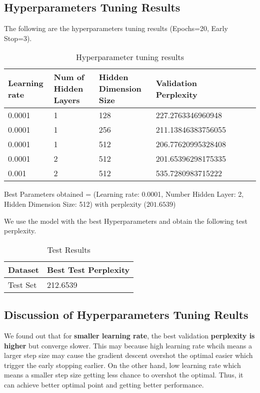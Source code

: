 \documentclass{article}
\begin{document}
\subsection{Hyperparameters Tuning Results}
The following are the hyperparameters tuning results (Epochs=20, Early Stop=3).

\begin{table}[htb]
	\caption{Hyperparameter tuning results}
	\label{sample-table}
	\centering
	\begin{tabular}{lllllll}
		\toprule
		\cmidrule{1-4}
		Learning rate & Num of Hidden Layers & Hidden Dimension Size & Validation Perplexity\\
		\midrule
		0.0001 & 1 & 128 & 227.2763346960948 \\
		0.0001 & 1  & 256 & 211.13846383756055  \\
		0.0001 & 1  & 512 & 206.77620995328408  \\
		0.0001 & 2 & 512 & 201.65396298175335  \\
		0.001 & 2  & 512 & 535.7280983715222  \\
		\bottomrule
	\end{tabular}
\end{table}

Best Parameters obtained = (Learning rate: 0.0001, Number Hidden Layer: 2, Hidden Dimension Size: 512) with perplexity ($201.6539$)

We use the model with the best Hyperparameters and obtain the following test perplexity.

\pagebreak

\begin{table}[htb]
	\caption{Test Results}
	\label{sample-table}
	\centering
	\begin{tabular}{ll}
		\toprule
		\cmidrule{1-2}
		Dataset & Best Test Perplexity\\
		\midrule
		Test Set & 212.6539  \\
		\bottomrule
	\end{tabular}
\end{table}

\subsection{Discussion of Hyperparameters Tuning Reults}

We found out that for \textbf{smaller learning rate}, the best validation \textbf{perplexity is higher} but converge slower. This may because high learning rate whcih means a larger step size may cause the gradient descent overshot the optimal easier which trigger the early stopping earlier. On the other hand, low learning rate which means a smaller step size getting less chance to overshot the optimal. Thus, it can achieve better optimal point and getting better performance.
\end{document}
